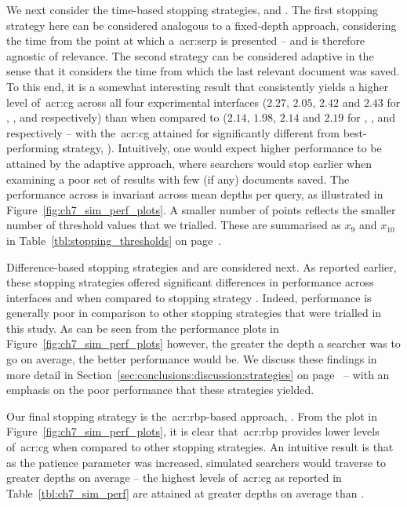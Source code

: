 We next consider the time-based stopping strategies,  and . The first stopping strategy here can be considered analogous to a fixed-depth approach, considering the time from the point at which a~\gls{acr:serp} is presented -- and is therefore agnostic of relevance. The second strategy can be considered adaptive in the sense that it considers the time from which the last relevant document was saved. To this end, it is a somewhat interesting result that  consistently yields a higher level of~\gls{acr:cg} across all four experimental interfaces ($2.27$, $2.05$, $2.42$ and $2.43$ for , ,  and  respectively) than when compared to  ($2.14$, $1.98$, $2.14$ and $2.19$ for , ,  and  respectively -- with the~\gls{acr:cg} attained for  significantly different from best-performing strategy, ). Intuitively, one would expect higher performance to be attained by the adaptive approach, where searchers would stop earlier when examining a poor set of results with few (if any) documents saved. The performance across  is invariant across mean depths per query, as illustrated in Figure~\ref{fig:ch7_sim_perf_plots}. A smaller number of points reflects the smaller number of threshold values that we trialled. These are summarised as $x_9$ and $x_{10}$ in Table~\ref{tbl:stopping_thresholds} on page~\pageref{tbl:stopping_thresholds}.

Difference-based stopping strategies  and  are considered next. As reported earlier, these stopping strategies offered significant differences in performance across interfaces  and  when compared to stopping strategy . Indeed, performance is generally poor in comparison to other stopping strategies that were trialled in this study. As can be seen from the performance plots in Figure~\ref{fig:ch7_sim_perf_plots} however, the greater the depth a searcher was to go on average, the better performance would be. We discuss these findings in more detail in Section~\ref{sec:conclusions:discussion:strategies} on page~\pageref{sec:conclusions:discussion:strategies} -- with an emphasis on the poor performance that these strategies yielded.

Our final stopping strategy is the~\gls{acr:rbp}-based approach, . From the plot in Figure~\ref{fig:ch7_sim_perf_plots}, it is clear that~\gls{acr:rbp} provides lower levels of~\gls{acr:cg} when compared to other stopping strategies. An intuitive result is that as the patience parameter was increased, simulated searchers would traverse to greater depths on average -- the highest levels of~\gls{acr:cg} as reported in Table~\ref{tbl:ch7_sim_perf} are attained at greater depths on average than .

